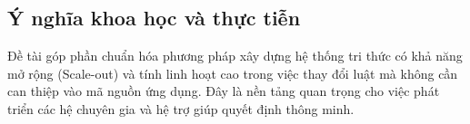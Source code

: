 \subsection{Ý nghĩa khoa học và thực tiễn}

Đề tài góp phần chuẩn hóa phương pháp xây dựng hệ thống tri thức có khả năng mở rộng (Scale-out) và tính linh hoạt cao trong việc thay đổi luật mà không cần can thiệp vào mã nguồn ứng dụng. Đây là nền tảng quan trọng cho việc phát triển các hệ chuyên gia và hệ trợ giúp quyết định thông minh.

